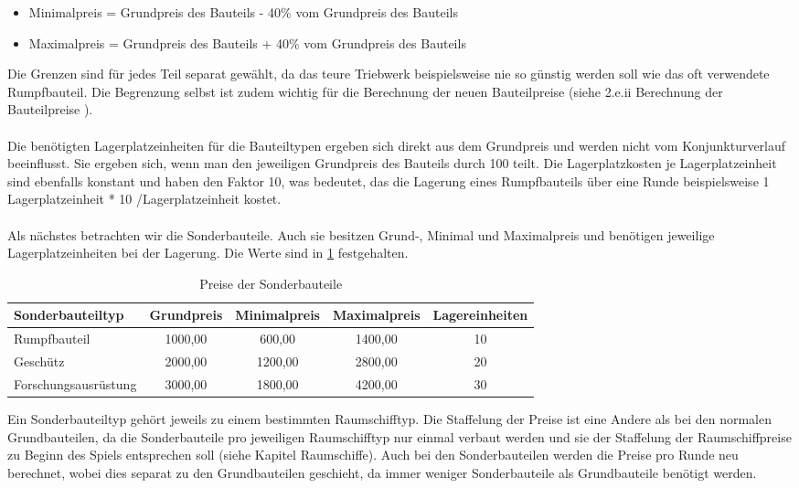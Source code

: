 \begin{itemize}
\item[] Minimalpreis = Grundpreis des Bauteils - 40\% vom Grundpreis des Bauteils
\item[] Maximalpreis = Grundpreis des Bauteils + 40\% vom Grundpreis des Bauteils
\end{itemize}

Die Grenzen sind für jedes Teil separat gewählt, da das teure Triebwerk beispielsweise nie so günstig werden soll wie das oft verwendete Rumpfbauteil. Die Begrenzung selbst ist zudem wichtig für die Berechnung der neuen Bauteilpreise (siehe 2.e.ii Berechnung der Bauteilpreise ). 
\\
\\
Die benötigten Lagerplatzeinheiten für die Bauteiltypen ergeben sich direkt aus dem Grundpreis und werden nicht vom Konjunkturverlauf beeinflusst. Sie ergeben sich, wenn man den jeweiligen Grundpreis des Bauteils durch 100 teilt. Die Lagerplatzkosten je Lagerplatzeinheit sind ebenfalls konstant und haben den Faktor 10, was bedeutet, das die Lagerung eines Rumpfbauteils über eine Runde beispielsweise 1 Lagerplatzeinheit * 10  \curr{}/Lagerplatzeinheit kostet.
\\
\\ 
Als nächstes betrachten wir die Sonderbauteile. Auch sie besitzen Grund-, Minimal und Maximalpreis und benötigen jeweilige Lagerplatzeinheiten bei der Lagerung. Die Werte sind in \ref{tab:spielwelt-datenbasis-raumschiffe-raumschiffbauteile-1} festgehalten.

\begin{table}[ht]\small
     \centering
     \begin{tabular}{ | l | c | c | c | c |   }
          \hline
          Sonderbauteiltyp & Grundpreis & Minimalpreis & Maximalpreis & Lagereinheiten \\
          \hline \hline
          Rumpfbauteil & 1000,00\curr{} & 600,00\curr{} & 1400,00\curr{} & 10 \\ \hline
          Geschütz & 2000,00\curr{} & 1200,00\curr{} & 2800,00\curr{} & 20 \\ \hline
          Forschungsausrüstung & 3000,00\curr{} & 1800,00\curr{} & 4200,00\curr{} & 30 \\
          \hline
     \end{tabular}
     \caption{Preise der Sonderbauteile}
     \label{tab:spielwelt-datenbasis-raumschiffe-raumschiffbauteile-1}
\end{table}

Ein Sonderbauteiltyp gehört jeweils zu einem bestimmten Raumschifftyp. Die Staffelung der Preise ist eine Andere als bei den normalen Grundbauteilen, da die Sonderbauteile pro jeweiligen Raumschifftyp nur einmal verbaut werden und sie der Staffelung der Raumschiffpreise zu Beginn des Spiels entsprechen soll (siehe Kapitel Raumschiffe). Auch bei den Sonderbauteilen werden die Preise pro Runde neu berechnet, wobei dies separat zu den Grundbauteilen geschieht, da immer weniger Sonderbauteile als Grundbauteile benötigt werden.




